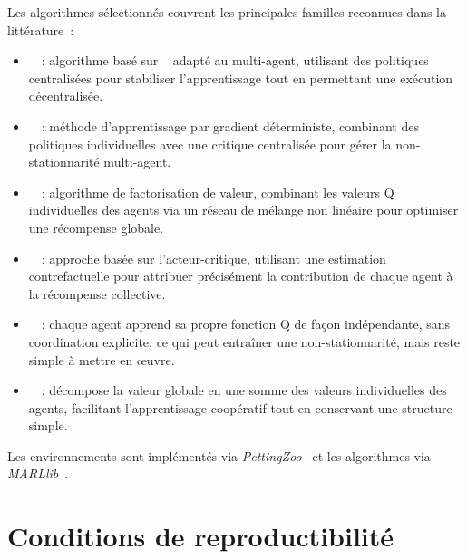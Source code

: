 \medskip

Les algorithmes  sélectionnés couvrent les principales familles reconnues dans la littérature~:
\begin{itemize}
  \item {}~\cite{Yu2022}~: algorithme basé sur ~\cite{Schulman2017} adapté au multi-agent, utilisant des politiques centralisées pour stabiliser l'apprentissage tout en permettant une exécution décentralisée.
  \item {}~\cite{lowe2017multi}~: méthode d'apprentissage par gradient déterministe, combinant des politiques individuelles avec une critique centralisée pour gérer la non-stationnarité multi-agent.
  \item {}~\cite{rashid2018qmix}~: algorithme de factorisation de valeur, combinant les valeurs Q individuelles des agents via un réseau de mélange non linéaire pour optimiser une récompense globale.
  \item {}~\cite{foerster2018counterfactual}~: approche basée sur l'acteur-critique, utilisant une estimation contrefactuelle pour attribuer précisément la contribution de chaque agent à la récompense collective.
  \item {}~\cite{Jiang2022}~: chaque agent apprend sa propre fonction Q de façon indépendante, sans coordination explicite, ce qui peut entraîner une non-stationnarité, mais reste simple à mettre en œuvre.
  \item {}~\cite{sunehag2018value}~: décompose la valeur globale en une somme des valeurs individuelles des agents, facilitant l'apprentissage coopératif tout en conservant une structure simple.
\end{itemize}
Les environnements sont implémentés via \textit{PettingZoo}~\cite{terry2020pettingzoo} et les algorithmes via \textit{MARLlib}~\cite{hu2022marllib}.

\section{Conditions de reproductibilité}

